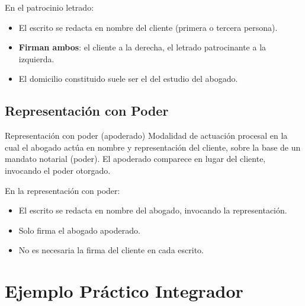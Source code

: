 \documentclass[12pt,oneside]{book}
\begin{document}
En el patrocinio letrado:
\begin{itemize}
    \item El escrito se redacta en nombre del cliente (primera o tercera persona).
    \item \textbf{Firman ambos}: el cliente a la derecha, el letrado patrocinante a la izquierda.
    \item El domicilio constituido suele ser el del estudio del abogado.
\end{itemize}

\section{Representación con Poder}

\begin{definition}{Representación con poder (apoderado)}
Modalidad de actuación procesal en la cual el abogado actúa en nombre y representación del cliente, sobre la base de un mandato notarial (poder). El apoderado comparece en lugar del cliente, invocando el poder otorgado.
\end{definition}

En la representación con poder:
\begin{itemize}
    \item El escrito se redacta en nombre del abogado, invocando la representación.
    \item Solo firma el abogado apoderado.
    \item No es necesaria la firma del cliente en cada escrito.
\end{itemize}

\chapter{Ejemplo Práctico Integrador}
\end{document}
